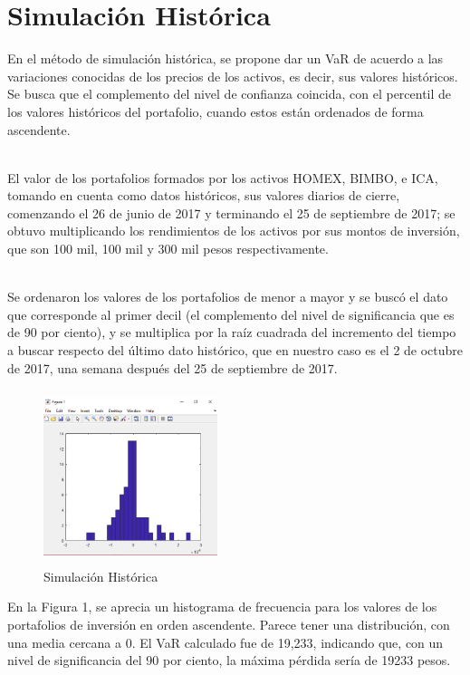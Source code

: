 \documentclass[12pt]{article}
\begin{document}
\section{Simulación Histórica}
En el método de simulación histórica, se propone dar un VaR de acuerdo a las variaciones conocidas de los precios de los activos, es decir, sus valores históricos. Se busca que el complemento del nivel de confianza coincida, con el percentil de los valores históricos del portafolio, cuando estos están ordenados de forma ascendente.

\ \\%
El valor de los portafolios formados por los activos HOMEX, BIMBO, e ICA, tomando en cuenta como datos históricos, sus valores diarios de cierre, comenzando el 26 de junio de 2017 y terminando el 25 de septiembre de 2017; se obtuvo multiplicando los rendimientos de los activos por sus montos de inversión, que son 100 mil, 100 mil y 300 mil pesos respectivamente.

\ \\%
Se ordenaron los valores de los portafolios de menor a mayor y se buscó el dato que corresponde al primer decil (el complemento del nivel de significancia que es de 90 por ciento), y se multiplica por la raíz cuadrada del incremento del tiempo a buscar respecto del último dato histórico, que en nuestro caso es el 2 de octubre de 2017, una semana después del 25 de septiembre de 2017. 

\begin{figure}[h]
\begin{minipage}{7in}
\begin{center}
\includegraphics[width=2in,height=2in]{hist.PNG}
\caption{Simulación Histórica} 
\label{Figure 1} 
\end{center}
\end{minipage}
\end{figure}

En la Figura 1, se aprecia un histograma de frecuencia para los valores de los portafolios de inversión en orden ascendente. Parece tener una distribución, con una media cercana a 0. El VaR calculado fue de 19,233, indicando que, con un nivel de significancia del 90 por ciento, la máxima pérdida sería de 19233 pesos.
\newpage
\end{document}
